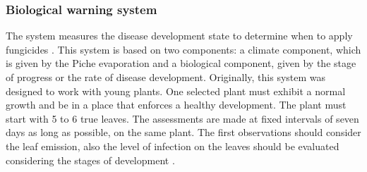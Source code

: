 \documentclass[review]{elsarticle}
\begin{document}
\subsubsection{Biological warning system}

The system measures the disease development state to determine when to
apply fungicides \citep{MarinVargas1995}.  This system is based on two
components: a climate component, which is given by the Piche
evaporation and a biological component, given by the stage of progress
or the rate of disease development. Originally, this system was
designed to work with young plants. One selected plant must exhibit a
normal growth and be in a place that enforces a healthy
development. The plant must start with 5 to 6 true leaves. The
assessments are made at fixed intervals of seven days as long as
possible, on the same plant. The first observations should consider
the leaf emission, also the level of infection on the leaves should be
evaluated considering the stages of development
\citep{MarinVargas1995}.
\end{document}
